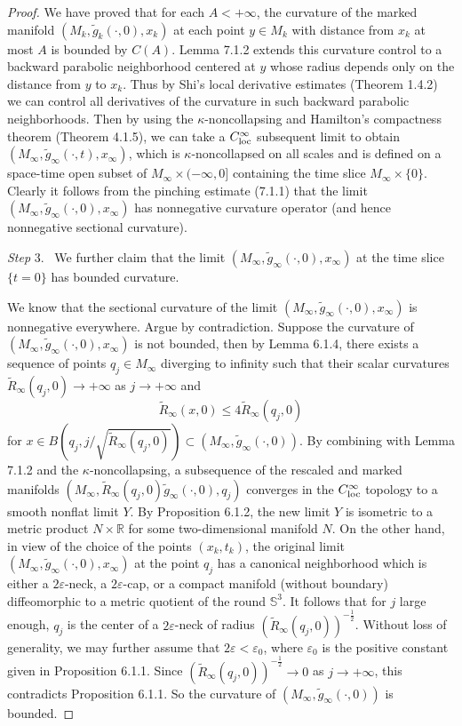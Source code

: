 \begin{proof}
We have proved that for each $A<+\infty$, the curvature of the
marked manifold $(M_k,\tilde{g}_k(\cdot,0),x_k)$ at each point
$y\in M_k$ with distance from $x_k$ at most $A$ is bounded by
$C(A)$. Lemma 7.1.2 extends this curvature control to a backward
parabolic neighborhood centered at $y$ whose radius depends only
on the distance from $y$ to $x_k$. Thus by Shi's local derivative
estimates (Theorem 1.4.2) we can control all derivatives of the
curvature in such backward parabolic neighborhoods. Then by using
the $\kappa$-noncollapsing and Hamilton's compactness theorem
(Theorem 4.1.5), we can take a $C_{\rm loc}^{\infty}$ subsequent
limit to obtain $(M_{\infty},
\tilde{g}_{\infty}(\cdot,t),x_{\infty})$, which is
$\kappa$-noncollapsed on all scales and is defined on a space-time
open subset of $M_{\infty}\times(-\infty,0]$ containing the time
slice $M_{\infty}\times\{0\}$. Clearly it follows from the
pinching estimate (7.1.1) that the limit $(M_{\infty},
\tilde{g}_{\infty}(\cdot,0),x_{\infty})$ has nonnegative curvature
operator (and hence nonnegative sectional curvature).

\medskip
{\it Step} 3. \ We further claim that the limit $(M_{\infty},
\tilde{g}_{\infty}(\cdot,0),x_{\infty})$ at the time slice $\{ t=0
\}$ has bounded curvature.

We know that the sectional curvature of the limit $(M_{\infty},
\tilde{g}_{\infty}(\cdot,0),x_{\infty})$ is nonnegative
everywhere. Argue by contradiction. Suppose the curvature of
$(M_{\infty}, \tilde{g}_{\infty}(\cdot,0),x_{\infty})$ is not
bounded, then by Lemma 6.1.4, there exists a sequence of points
$q_j \in M_{\infty}$ diverging to infinity such that their scalar
curvatures $\tilde{R}_{\infty}(q_j,0) \rightarrow +\infty$ as $j
\rightarrow +\infty$ and
$$
\tilde{R}_{\infty}(x,0) \leq 4\tilde{R}_{\infty}(q_j,0)
$$
for $x \in B(q_j, j/\sqrt{\tilde{R}_{\infty}(q_j,0)})\subset
(M_{\infty},\tilde{g}_{\infty}(\cdot,0))$. By combining with Lemma
7.1.2 and the $\kappa$-noncollapsing, a subsequence of the
rescaled and marked manifolds
$(M_{\infty},\tilde{R}_{\infty}(q_j,0)\tilde{g}_{\infty}(\cdot,0),q_j)$
converges in the $C^{\infty}_{\rm loc}$ topology to a smooth
nonflat limit $Y$. By Proposition 6.1.2, the new limit $Y$ is
isometric to a metric product $N \times \mathbb{R}$ for some
two-dimensional manifold $N$. On the other hand, in view of the
choice of the points $(x_k,t_k)$, the original limit $(M_{\infty},
\tilde{g}_{\infty}(\cdot,0),x_{\infty})$ at the point $q_j$ has a
canonical neighborhood which is either a $2\varepsilon$-neck, a
$2\varepsilon$-cap, or a compact manifold (without boundary)
diffeomorphic to a metric quotient of the round $\mathbb{S}^3$. It
follows that for $j$ large enough, $q_j$ is the center of a
$2\varepsilon$-neck of radius
$(\tilde{R}_{\infty}(q_j,0))^{-\frac{1}{2}}$. Without loss of
generality, we may further assume that $2\varepsilon <
\varepsilon_0$, where $\varepsilon_0$ is the positive constant
given in Proposition 6.1.1. Since
$(\tilde{R}_{\infty}(q_j,0))^{-\frac{1}{2}}\rightarrow 0$ as
$j\rightarrow +\infty$, this contradicts Proposition 6.1.1. So the
curvature of $(M_{\infty}, \tilde{g}_{\infty}(\cdot,0))$ is
bounded.


\end{proof}
